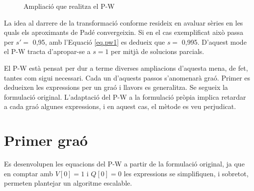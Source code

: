 \begin{figure}[!htb] \footnotesize
    \begin{center}
    \caption{Ampliació que realitza el P-W}
    \label{fig:PWzoom}
    \end{center}
    \end{figure}

La idea al darrere de la transformació conforme resideix en avaluar sèries en les quals els aproximants de Padé convergeixin. Si en el cas exemplificat això passa per $s'=$ 0,95, amb l'Equació \ref{eq.pw1} es dedueix que $s=$ 0,995. D'aquest mode el P-W tracta d'apropar-se a $s=1$ per mitjà de solucions parcials.

El P-W està pensat per dur a terme diverses ampliacions d'aquesta mena, de fet, tantes com sigui necessari. Cada un d'aquests passos s'anomenarà graó. Primer es dedueixen les expressions per un graó i llavors es generalitza. Se segueix la formulació original. L'adaptació del P-W a la formulació pròpia implica retardar a cada graó algunes expressions, i en aquest cas, el mètode es veu perjudicat.

\section{Primer graó}
Es desenvolupen les equacions del P-W a partir de la formulació original, ja que en comptar amb $V[0]=1$ i $Q[0]=0$ les expressions se simplifiquen, i sobretot, permeten plantejar un algoritme escalable. 

